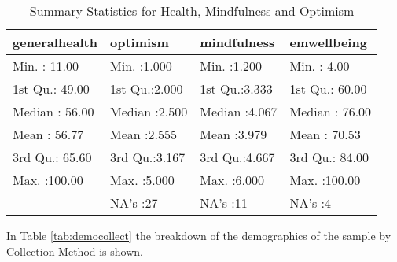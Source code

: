 \documentclass{article}
\begin{document}
\begin{table}[ht]
\centering
\begin{tabular}{llll}
  \hline
generalhealth &    optimism &  mindfulness &  emwellbeing \\ 
  \hline
Min.   : 11.00   & Min.   :1.000   & Min.   :1.200   & Min.   :  4.00   \\ 
  1st Qu.: 49.00   & 1st Qu.:2.000   & 1st Qu.:3.333   & 1st Qu.: 60.00   \\ 
  Median : 56.00   & Median :2.500   & Median :4.067   & Median : 76.00   \\ 
  Mean   : 56.77   & Mean   :2.555   & Mean   :3.979   & Mean   : 70.53   \\ 
  3rd Qu.: 65.60   & 3rd Qu.:3.167   & 3rd Qu.:4.667   & 3rd Qu.: 84.00   \\ 
  Max.   :100.00   & Max.   :5.000   & Max.   :6.000   & Max.   :100.00   \\ 
   & NA's   :27   & NA's   :11   & NA's   :4   \\ 
   \hline
\end{tabular}
\caption{Summary Statistics for Health, Mindfulness and Optimism} 
\label{tab:sumstatscales}
\end{table}


In Table \ref{tab:democollect} the breakdown of the demographics
of the sample by Collection Method is shown.

\begin{table}[ht]
\centering
{}
\caption{Demographic Statistics for Sample One (paper sample)} 
\label{tab:democollect}
\end{table}
\end{document}
